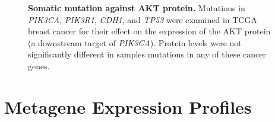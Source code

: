 \begin{figure}[!ht]
\begin{center}
    \end{center}
    \caption[Somatic mutation against AKT protein]{\small \textbf{Somatic mutation against AKT protein.} Mutations in \textit{PIK3CA}, \textit{PIK3R1}, \textit{CDH1}, and \textit{TP53} were examined in \gls{TCGA} breast cancer for their effect on the expression of the AKT protein (a downstream target of \textit{PIK3CA}). Protein levels were not significantly different in samples mutations in any of these cancer genes.
}
\label{fig:mutation_expr_prot2}
\end{figure}

\clearpage
\section{Metagene Expression Profiles}
\label{appendix:mg_expr_SL}



